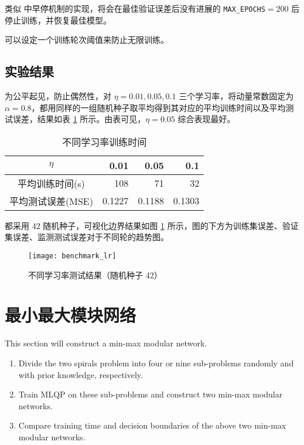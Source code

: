     类似 \cite{tfearly} 中早停机制的实现，将会在最佳验证误差后没有进展的 \texttt{MAX\_EPOCHS}$=200$ 后停止训练，并恢复最佳模型。

    可以设定一个训练轮次阈值来防止无限训练。
    

    \subsection{实验结果}

    为公平起见，防止偶然性，对 $\eta=0.01,0.05,0.1$ 三个学习率，将动量常数固定为 $\alpha=0.8$，都用同样的一组随机种子取平均得到其对应的平均训练时间以及平均测试误差，结果如表 \ref{tab:benchmark_lr} 所示。由表可见，$\eta=0.05$ 综合表现最好。

    \begin{table}[H]
        \centering
        \caption{不同学习率训练时间}\label{tab:benchmark_lr}
        \begin{tabular}{crrr}
            \toprule
            $\eta$ & 0.01 & 0.05 & 0.1 \\
            \midrule
            平均训练时间(s) & 108 & 71 & 32 \\
            平均测试误差(MSE) & 0.1227 & 0.1188 & 0.1303 \\
            \bottomrule
        \end{tabular}
    \end{table}

    都采用 42 随机种子，可视化边界结果如图 \ref{fig:benchmark_lr} 所示，图的下方为训练集误差、验证集误差、监测测试误差对于不同轮的趋势图。

    \begin{figure}[H]
        \centering
        \texttt{[image: benchmark\_lr]}
        \caption{不同学习率测试结果（随机种子 42）}\label{fig:benchmark_lr}
    \end{figure}

    \section{最小最大模块网络}

    \begin{problem}
        This section will construct a min-max modular network.
        \begin{enumerate}
            \item Divide the two spirals problem into four or nine sub-problems randomly and with prior knowledge, respectively.
            \item Train MLQP on these sub-problems and construct two min-max modular networks.
            \item Compare training time and decision boundaries of the above two min-max modular networks.
        \end{enumerate}
    \end{problem}

